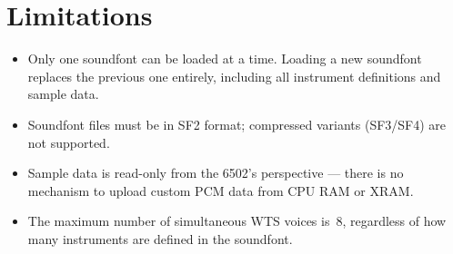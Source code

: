 \section{Limitations}
\label{sec:wts-limits}

\begin{itemize}
  \item Only one soundfont can be loaded at a time.  Loading a new soundfont
        replaces the previous one entirely, including all instrument definitions
        and sample data.
  \item Soundfont files must be in SF2 format; compressed variants (SF3/SF4) are
        not supported.
  \item Sample data is read-only from the 6502's perspective --- there is no
        mechanism to upload custom PCM data from CPU RAM or XRAM.
  \item The maximum number of simultaneous WTS voices is~8, regardless of how
        many instruments are defined in the soundfont.
\end{itemize}
